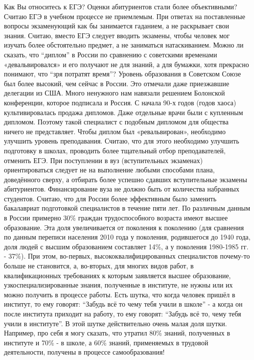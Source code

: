 \begin{drama}
	\maxspeaks Как Вы относитесь к ЕГЭ? Оценки абитуриентов стали более объективными?
	\michaelspeaks Считаю ЕГЭ в учебном процессе не приемлемым. При ответах на поставленные вопросы экзаменующий как бы занимается гаданием, а не раскрывает свои знания. Считаю, вместо ЕГЭ следует вводить экзамены, чтобы человек мог изучать более обстоятельно предмет, а не заниматься натаскиванием.
	\maxspeaks Можно ли сказать, что “диплом” в России по сравнению с советскими временами «девальвировался» и его получают не для знаний, а для бумажки, хотя прекрасно понимают, что “зря потратят время”?
	\michaelspeaks Уровень образования в Советском Союзе был более высокий, чем сейчас в России. Это отмечали даже приезжавшие делегации из США. Много ненужного нам навязали решением Болонской конференции, которое подписала и Россия. С начала 90-х годов (годов хаоса) культивировалась продажа дипломов. Даже отдельные врачи были с купленным дипломом. Поэтому такой специалист с подобным дипломом для общества ничего не представляет. Чтобы диплом был «ревальвирован», необходимо улучшить уровень преподавания. Считаю, что для этого необходимо улучшить подготовку в школах, проводить более тщательный отбор преподавателей, отменить ЕГЭ. При поступлении в вуз (вступительных экзаменах) ориентироваться следует не на выполнение любыми способами плана, доведённого сверху, а отбирать более успешно сдавших вступительные экзамены абитуриентов. Финансирование вуза не должно быть от количества набранных студентов. Считаю, что для России более эффективным было заменить бакалавриат подготовкой специалистов в течение пяти лет.
	\maxspeaks По различным данным в России примерно 30\% граждан трудоспособного возраста имеют высшее образование. Эта доля увеличивается от поколения к поколению (для сравнения по данным переписи населения 2010 года у поколения, родившегося до 1940 года, доля людей с высшим образованием составляет 14\%, а у поколения 1980-1985 гг. - 37\%). При этом, во-первых, высококвалифицированных специалистов почему-то больше не становится, а, во-вторых, для многих видов работ, в квалификационных требованиях к которым заявляется высшее образование, узкоспециализированные знания, полученные в институте, не нужны или их можно получить в процессе работы. 
Есть шутка, что когда человек пришёл в институт, то ему говорят: “Забудь всё то чему тебя учили в школе” - а когда он после института приходит на работу, то ему говорят: “Забудь всё то, чему тебя учили в институте”. В этой шутке действительно очень малая доля шутки. Например, про себя я могу сказать, что утратил 80\% знаний, полученных в институте и 70\% - в школе, а 60\% знаний, применяемых в трудовой деятельности, получены в процессе самообразования!

\end{drama}
